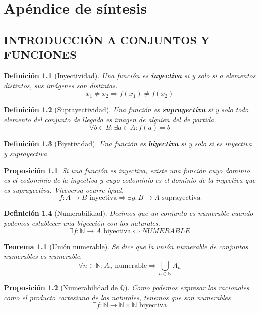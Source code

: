 \documentclass[10pt,a4paper,openright]{book}
\newtheorem{teorema}{Teorema}[chapter]
\newtheorem{proposicion}{Proposición}[chapter]
\newtheorem{definicion}{Definición}[chapter]
\begin{document}
\appendix
\part*{Apéndice de síntesis}
\chapter{INTRODUCCIÓN A CONJUNTOS Y FUNCIONES}
\begin{definicion}[Inyectividad]
Una función es \textbf{inyectiva} si y solo si a elementos distintos, sus imágenes son distintas.
$$x_1\neq x_2 \Rightarrow f(x_1)\neq f(x_2)$$
\end{definicion}

\begin{definicion}[Suprayectividad]
Una función es \textbf{suprayectiva} si y solo todo elemento del conjunto de llegada es imagen de alguien del de partida.
$$\forall b \in B: \exists a\in A: f(a)=b$$
\end{definicion}

\begin{definicion}[Biyetividad]
Una función es \textbf{biyectiva} si y solo si es inyectiva y suprayectiva.
\end{definicion}

\begin{proposicion}
Si una función es inyectiva, existe una función cuyo dominio es el codominio de la inyectiva y cuyo codominio es el dominio de la inyectiva que es suprayectiva. Viceversa ocurre igual.
$$f: A \longrightarrow B \mbox{ inyectiva} \Rightarrow \exists g: B\longrightarrow A \mbox{ suprayectiva}$$
\end{proposicion}

\begin{definicion}[Numerabilidad]
Decimos que un conjunto es numerable cuando podemos establecer una biyección con los naturales.
$$\exists f: \mathbb N \longrightarrow A \mbox{ biyectiva}\Leftrightarrow NUMERABLE$$
\end{definicion}


\begin{teorema}[Unión numerable]
Se dice que la unión numerable de conjuntos numerables es numerable.
$$\forall n\in \mathbb N: A_n \mbox{ numerable}\Rightarrow\bigcup_{n\in \mathbb N} A_n$$
\end{teorema}


\begin{proposicion}[Numerabilidad de $\mathbb Q$]
Como podemos expresar los racionales como el producto cartesiano de los naturales, tenemos que son numerables
$$\exists f: \mathbb N \longrightarrow \mathbb N \times \mathbb N \mbox{ biyectiva}$$
\end{proposicion}
\end{document}
